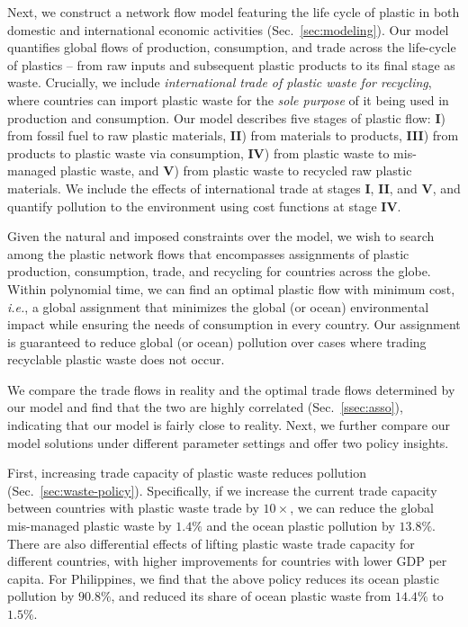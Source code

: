 \documentclass[dvipsnames]{article}
\begin{document}
Next, we construct a network flow model featuring the life cycle of plastic in both domestic and international economic activities (Sec.~\ref{sec:modeling}). Our model quantifies %
global flows of production, consumption, and trade across the life-cycle of plastics -- from raw inputs and subsequent plastic products to its final stage as waste. Crucially, we include \textit{international trade of plastic waste for recycling}, where countries can import plastic waste for the \textit{sole purpose} of it being used in production and consumption. Our model describes five stages of plastic flow: \textbf{I}) from fossil fuel to raw plastic materials, \textbf{II}) from materials to products, \textbf{III}) from products to plastic waste via consumption, \textbf{IV}) from plastic waste to mis-managed plastic waste, and \textbf{V}) from plastic waste to recycled raw plastic materials. We include the effects of international trade at stages \textbf{I}, \textbf{II}, and \textbf{V}, and quantify pollution to the environment using cost functions at stage \textbf{IV}.

Given the natural and imposed constraints over the model, we wish to search among the plastic network flows that encompasses assignments of plastic production, consumption, trade, and recycling for countries across the globe.
Within polynomial time, we can find an optimal plastic flow with minimum cost, \textit{i.e.}, a global assignment that minimizes the global (or ocean) environmental impact while ensuring the needs of consumption in every country. Our assignment is guaranteed to reduce global (or ocean) pollution over cases where trading recyclable plastic waste does not occur.

We compare the trade flows in reality and the optimal trade flows determined by our model and find that the two are highly correlated (Sec.~\ref{ssec:asso}), indicating that our model is fairly close to reality. Next, we further compare our model solutions under different parameter settings and offer two policy insights. 

First, increasing trade capacity of plastic waste reduces pollution (Sec.~\ref{sec:waste-policy}). Specifically, if we increase the current trade capacity between countries with plastic waste trade by $10 \times$, we can reduce the global mis-managed plastic waste by $1.4\%$ and the ocean plastic pollution by $13.8\%$. There are also differential effects of lifting plastic waste trade capacity for different countries, with higher improvements for countries with lower GDP per capita. For Philippines, we find that the above policy reduces its ocean plastic pollution by $90.8\%$, and reduced its share of ocean plastic waste from $14.4\%$ to $1.5\%$.
\end{document}
